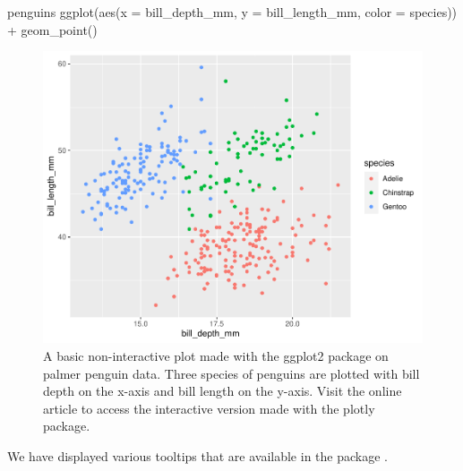 \begin{Schunk}
\begin{Sinput}
penguins %
  ggplot(aes(x = bill_depth_mm, y = bill_length_mm,
             color = species)) +
  geom_point()
\end{Sinput}
\begin{figure}
\includegraphics{learningtower_files/figure-latex/penguins-ggplot-1} \caption[A basic non-interactive plot made with the ggplot2 package on palmer penguin data]{A basic non-interactive plot made with the ggplot2 package on palmer penguin data. Three species of penguins are plotted with bill depth on the x-axis and bill length on the y-axis. Visit the online article to access the interactive version made with the plotly package.}\label{fig:penguins-ggplot}
\end{figure}
\end{Schunk}

\citet{RJ-2021-050}

We have displayed various tooltips that are available in the package
.



\address{%
Priya Ravindra Dingorkar\\
Monash University\\%
Department Econometrics and Business Statistics\\ Clayton, Australia\\
%
\url{https://www.linkedin.com/in/priya-dingorkar/}\\%
%
\href{mailto:priyadingorkar@gmail.com}{\nolinkurl{priyadingorkar@gmail.com}}%
}

